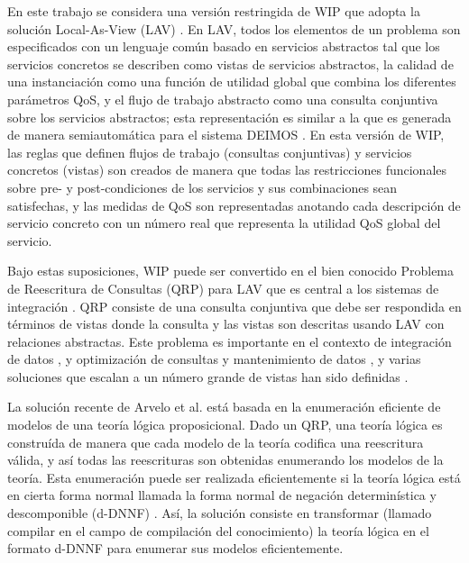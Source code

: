 En este trabajo se considera una versión restringida de WIP que adopta la
solución Local-As-View (LAV) \cite{levy:bucket}. En LAV, todos los elementos de un
problema son especificados con un lenguaje común basado en servicios abstractos
tal que los servicios concretos se describen como vistas de servicios
abstractos, la calidad de una instanciación como una función de utilidad global
que combina los diferentes parámetros QoS, y el flujo de trabajo abstracto como
una consulta conjuntiva sobre los servicios abstractos; esta representación es
similar a la que es generada de manera semiautomática para el sistema DEIMOS
\cite{AmbiteISWC09}. En esta versión de WIP, las reglas que definen flujos de trabajo
(consultas conjuntivas) y servicios concretos (vistas) son creados de manera que
todas las restricciones funcionales sobre pre- y post-condiciones de los
servicios y sus combinaciones sean satisfechas, y las medidas de QoS son
representadas anotando cada descripción de servicio concreto con un número real
que representa la utilidad QoS global del servicio.

Bajo estas suposiciones, WIP puede ser convertido en el bien conocido Problema
de Reescritura de Consultas (QRP) para LAV que es central a los sistemas de
integración \cite{halevy:survey}. QRP consiste de una consulta conjuntiva que debe ser
respondida en términos de vistas donde la consulta y las vistas son descritas
usando LAV con relaciones abstractas. Este problema es importante en el contexto
de integración de datos \cite{Chen05,JaudoinPRST05}, y optimización de consultas y mantenimiento
de datos \cite{AfratiLU07,levy:bucket}, y varias soluciones que escalan a un número grande de
vistas han sido definidas \cite{arvelo:aaai06,pods:DuschkaG97,sac:DuschkaG97,levy:bucket,pottinger:minicon}.

La solución recente de Arvelo et al. \cite{arvelo:aaai06} está basada en la enumeración
eficiente de modelos de una teoría lógica proposicional. Dado un QRP, una teoría
lógica es construída de manera que cada modelo de la teoría codifica una
reescritura válida, y así todas las reescrituras son obtenidas enumerando los
modelos de la teoría. Esta enumeración puede ser realizada eficientemente si la
teoría lógica está en cierta forma normal llamada la forma normal de negación
determinística y descomponible (d-DNNF) \cite{darwiche:d-dnnfs}. Así,
la solución consiste en transformar (llamado compilar en el campo de
compilación del conocimiento) la teoría lógica en el formato d-DNNF para
enumerar sus modelos eficientemente.

